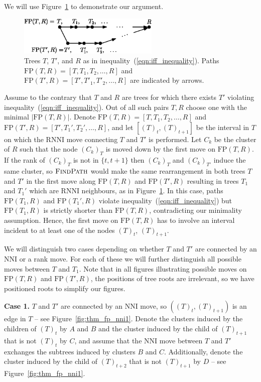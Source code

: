 \documentclass[11pt]{amsart}
\newcommand{\rnni}{\mathrm{RNNI}}
\newcommand{\findpath}{\textsc{FindPath}}
\newcommand{\nni}{\mathrm{NNI}}
\newcommand{\fp}{\mathrm{FP}}
\begin{document}
We will use Figure~\ref{fig:proof_idea} to demonstrate our argument.

\begin{figure}[ht]
\centering
\includegraphics[width=0.6\textwidth]{proof_idea_ag}
\caption{Trees $T$, $T'$, and $R$ as in inequality~(\ref{eqn:iff_inequality}).
Paths $\fp(T,R) = [T,T_1,T_2, \ldots, R]$ and $\fp(T',R) = [T',T'_1,T'_2, \ldots, R]$ are indicated by arrows.}
\label{fig:proof_idea}
\end{figure}

Assume to the contrary that $T$ and $R$ are trees for which there exists $T'$ violating inequality~(\ref{eqn:iff_inequality}).
Out of all such pairs $T, R$ choose one with the minimal $|\fp(T, R)|$.
Denote $\fp(T,R) = [T, T_1, T_2, \ldots, R]$ and $\fp(T', R) = [T', T_1', T_2', \ldots, R]$, and let $[(T)_t, (T)_{t+1}]$ be the interval in $T$ on which the $\rnni$ move connecting $T$ and $T'$ is performed.
Let $C_k$ be the cluster of $R$ such that the node $(C_k)_T$ is moved down by the first move on $\fp(T, R)$.
If the rank of $(C_k)_T$ is not in $\{t, t+1\}$ then $(C_k)_T$ and $(C_k)_{T'}$ induce the same cluster, so $\findpath$ would make the same rearrangement in both trees $T$ and $T'$ in the first move along $\fp(T, R)$ and $\fp(T', R)$ resulting in trees $T_1$ and $T_1'$ which are $\rnni$ neighbours, as in Figure~\ref{fig:proof_idea}.
In this case, paths $\fp(T_1, R)$ and $\fp(T_1', R)$ violate inequality~(\ref{eqn:iff_inequality}) but $\fp(T_1, R)$ is strictly shorter than $\fp(T, R)$, contradicting our minimality assumption.
Hence, the first move on $\fp(T, R)$ has to involve an interval incident to at least one of the nodes $(T)_t$, $(T)_{t+1}$.

We will distinguish two cases depending on whether $T$ and $T'$ are connected by an $\nni$ or a rank move.
For each of these we will further distinguish all possible moves between $T$ and $T_1$.
Note that in all figures illustrating possible moves on $\fp(T,R)$ and $\fp(T',R)$, the positions of tree roots are irrelevant, so we have positioned roots to simplify our figures.

\textbf{Case 1.}
$T$ and $T'$ are connected by an $\nni$ move, so $((T)_t,(T)_{t+1})$ is an edge in $T$ -- see Figure~\ref{fig:thm_fp_nni1}.
Denote the clusters induced by the children of $(T)_t$ by $A$ and $B$ and the cluster induced by the child of $(T)_{t+1}$ that is not $(T)_t$ by $C$, and assume that the $\nni$ move between $T$ and $T'$ exchanges the subtrees induced by clusters $B$ and $C$.
Additionally, denote the cluster induced by the child of $(T)_{t+2}$ that is not $(T)_{t+1}$ by $D$ -- see Figure~\ref{fig:thm_fp_nni1}.
\end{document}
